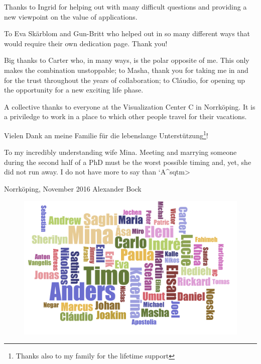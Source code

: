 Thanks to Ingrid for helping out with many difficult questions and providing a new viewpoint on the value of applications.

To Eva Sk\"arblom and Gun-Britt who helped out in so many different ways that would require their own dedication page. Thank you!

Big thanks to Carter who, in many ways, is the polar opposite of me. This only makes the combination unstoppable; to Masha, thank you for taking me in and for the trust throughout the years of collaboration; to Cl\'audio, for opening up the opportunity for a new exciting life phase.

A collective thanks to everyone at the Visualization Center C in Norrk\"oping. It is a priviledge to work in a place to which other people travel for their vacations.


Vielen Dank an meine Familie f\"ur die lebenslange Unterst\"utzung\footnote{Thanks also to my family for the lifetime support}!

To my incredibly understanding wife Mina. Meeting and marrying someone during the second half of a PhD must be the worst possible timing and, yet, she did not run away. I do not have more to say than \<`A^sqtm>

\vspace{1cm}
\hrulefill
\hrulefill

Norrk\"oping, November 2016 \hfill Alexander Bock

\vfill

\begin{figure}[hb]
\centering
\includegraphics[width=0.75\linewidth]{figures/misc/wordcloud.pdf}
\end{figure}

